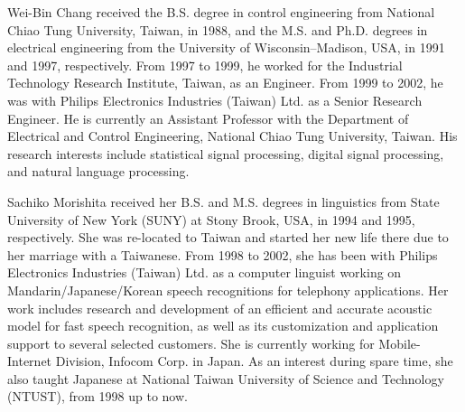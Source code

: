 



\begin{biography}
\biotitle{}

 {Wei-Bin Chang received the B.S. degree
in control engineering from National Chiao Tung University,
Taiwan, in 1988, and the M.S. and Ph.D. degrees in electrical
engineering from the University of Wisconsin--Madison, USA, in
1991 and 1997, respectively.  From 1997 to 1999, he worked for the
Industrial Technology Research Institute, Taiwan, as an Engineer.
From 1999 to 2002, he was with Philips Electronics Industries
(Taiwan) Ltd. as a Senior Research Engineer.  He is currently an
Assistant Professor with the Department of Electrical and Control
Engineering, National Chiao Tung University, Taiwan.  His research
interests include statistical signal processing, digital signal
processing, and natural language processing.}

 {Sachiko Morishita received her B.S.
and M.S. degrees in linguistics from State University of New York
(SUNY) at Stony Brook, USA, in 1994 and 1995, respectively. She
was re-located to Taiwan and started her new life there due to her
marriage with a Taiwanese. From 1998 to 2002, she has been with
Philips Electronics Industries (Taiwan) Ltd. as a computer
linguist working on Mandarin/Japanese/Korean speech recognitions
for telephony applications. Her work includes research and
development of an efficient and accurate acoustic model for fast
speech recognition, as well as its customization and application
support to several selected customers. She is currently working
for Mobile-Internet Division, Infocom Corp. in Japan. As an
interest during spare time, she also taught Japanese at National
Taiwan University of Science and Technology (NTUST), from 1998 up
to now.}


\end{biography}


